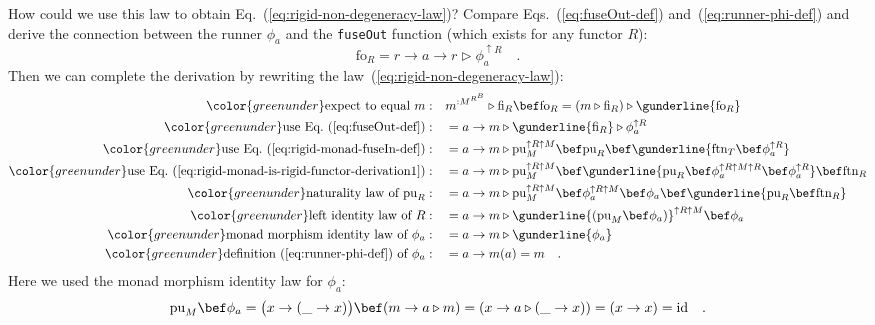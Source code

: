 How could we use this law to obtain Eq.~(\ref{eq:rigid-non-degeneracy-law})?
Compare Eqs.~(\ref{eq:fuseOut-def}) and~(\ref{eq:runner-phi-def})
and derive the connection between the runner $\phi_{a}$ and the \lstinline!fuseOut!
function (which exists for any functor $R$):
\[
\text{fo}_{R}=r\rightarrow a\rightarrow r\triangleright\phi_{a}^{\uparrow R}\quad.
\]
Then we can complete the derivation by rewriting the law~(\ref{eq:rigid-non-degeneracy-law}):
\begin{align*}
{\color{greenunder}\text{expect to equal }m:}\quad & m^{:M^{R^{B}}}\triangleright\text{fi}_{R}\bef\text{fo}_{R}=\left(m\triangleright\text{fi}_{R}\right)\triangleright\gunderline{\text{fo}_{R}}\\
{\color{greenunder}\text{use Eq.~(\ref{eq:fuseOut-def})}:}\quad & =a\rightarrow m\triangleright\gunderline{\text{fi}_{R}}\triangleright\phi_{a}^{\uparrow R}\\
{\color{greenunder}\text{use Eq.~(\ref{eq:rigid-monad-fuseIn-def})}:}\quad & =a\rightarrow m\triangleright\text{pu}_{M}^{\uparrow R\uparrow M}\bef\text{pu}_{R}\bef\gunderline{\text{ftn}_{T}\bef\phi_{a}^{\uparrow R}}\\
{\color{greenunder}\text{use Eq.~(\ref{eq:rigid-monad-is-rigid-functor-derivation1})}:}\quad & =a\rightarrow m\triangleright\text{pu}_{M}^{\uparrow R\uparrow M}\bef\gunderline{\text{pu}_{R}\bef\phi_{a}^{\uparrow R\uparrow M\uparrow R}\bef\phi_{a}^{\uparrow R}}\bef\text{ftn}_{R}\\
{\color{greenunder}\text{naturality law of }\text{pu}_{R}:}\quad & =a\rightarrow m\triangleright\text{pu}_{M}^{\uparrow R\uparrow M}\bef\phi_{a}^{\uparrow R\uparrow M}\bef\phi_{a}\bef\gunderline{\text{pu}_{R}\bef\text{ftn}_{R}}\\
{\color{greenunder}\text{left identity law of }R:}\quad & =a\rightarrow m\triangleright\gunderline{(\text{pu}_{M}\bef\phi_{a})}^{\uparrow R\uparrow M}\bef\phi_{a}\\
{\color{greenunder}\text{monad morphism identity law of }\phi_{a}:}\quad & =a\rightarrow m\triangleright\gunderline{\phi_{a}}\\
{\color{greenunder}\text{definition~(\ref{eq:runner-phi-def}) of }\phi_{a}:}\quad & =a\rightarrow m(a)=m\quad.
\end{align*}
Here we used the monad morphism identity law for $\phi_{a}$:
\[
\text{pu}_{M}\bef\phi_{a}=\big(x\rightarrow(\_\rightarrow x)\big)\bef(m\rightarrow a\triangleright m)=\left(x\rightarrow a\triangleright(\_\rightarrow x)\right)=\left(x\rightarrow x\right)=\text{id}\quad.
\]


